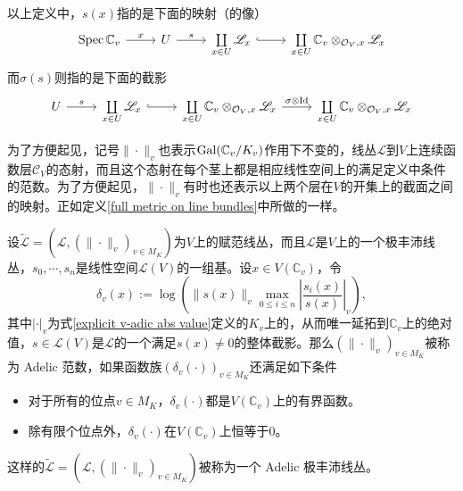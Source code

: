 \begin{remark}
以上定义中，$s(x)$指的是下面的映射（的像）
\begin{equation}
\begin{tikzcd}
\spec \mathbb{C}_v \arrow[r, "x"] & U \arrow[r, "s"] & \coprod\limits_{x\in U} \mathscr{L}_x \arrow[r, hookrightarrow] & \coprod\limits_{x\in U} \mathbb{C}_v \otimes_{\mathcal{O}_V, x} \mathscr{L}_x
\end{tikzcd}
\end{equation}
而$\sigma(s)$则指的是下面的截影
\begin{equation}
\begin{tikzcd}
U \arrow[r, "s"] & \coprod\limits_{x\in U} \mathscr{L}_x \arrow[r, hookrightarrow] & \coprod\limits_{x\in U} \mathbb{C}_v \otimes_{\mathcal{O}_V, x} \mathscr{L}_x \arrow[r, "\sigma\otimes\identity"] & \coprod\limits_{x\in U} \mathbb{C}_v \otimes_{\mathcal{O}_V, x} \mathscr{L}_x
\end{tikzcd}
\end{equation}
\end{remark}

\begin{remark}
为了方便起见，记号$\|\cdot\|_v$也表示$\operatorname{Gal}(\mathbb{C}_v / K_v)$作用下不变的，线丛$\mathscr{L}$到$V$上连续函数层$\mathscr{C}_V$的态射，而且这个态射在每个茎上都是相应线性空间上的满足定义中条件的范数。为了方便起见，$\|\cdot\|_v$有时也还表示以上两个层在$V$的开集上的截面之间的映射。正如定义\ref{full metric on line bundles}中所做的一样。
\end{remark}

\begin{definition}
设$\widetilde{\mathscr{L}} = (\mathscr{L}, (\|\cdot\|_v)_{v\in M_K})$为$V$上的赋范线丛，而且$\mathscr{L}$是$V$上的一个极丰沛线丛，$s_0,\cdots,s_n$是线性空间$\mathscr{L}(V)$的一组基。设$x\in V(\mathbb{C}_v)$，令
\begin{equation}
\delta_v(x) := \log\left( \|s(x)\|_v \max\limits_{0\leqslant i \leqslant n} \left| \dfrac{s_i(x)}{s(x)} \right|_v \right),
\end{equation}
其中$|\cdot|_v$为式\eqref{explicit v-adic abs value}定义的$K_v$上的，从而唯一延拓到$\mathbb{C}_v$上的绝对值，$s\in \mathscr{L}(V)$是$\mathscr{L}$的一个满足$s(x)\neq 0$的整体截影。那么$(\|\cdot\|_v)_{v\in M_K}$被称为 Adelic 范数，如果函数族$(\delta_v(\cdot))_{v\in M_K}$还满足如下条件
\begin{itemize}
\item 对于所有的位点$v\in M_K$，$\delta_v(\cdot)$都是$V(\mathbb{C}_v)$上的有界函数。
\item 除有限个位点外，$\delta_v(\cdot)$在$V(\mathbb{C}_v)$上恒等于$0$。
\end{itemize}
这样的$\widetilde{\mathscr{L}} = (\mathscr{L}, (\|\cdot\|_v)_{v\in M_K})$被称为一个 Adelic 极丰沛线丛。
\end{definition}

